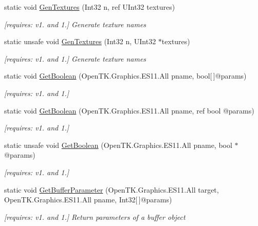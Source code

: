 \begin{DoxyCompactItemize}
static void \hyperlink{class_open_t_k_1_1_graphics_1_1_e_s11_1_1_g_l_af9dbde2086dd504d6b86b9cd4a1ed2ad}{Gen\-Textures} (Int32 n, ref U\-Int32 textures)
\begin{DoxyCompactList}\small\item\em \mbox{[}requires\-: v1. and 1.\mbox{]} Generate texture names \end{DoxyCompactList}\item 
static unsafe void \hyperlink{class_open_t_k_1_1_graphics_1_1_e_s11_1_1_g_l_a75e5e99ca25227c7be8fa03d30234abf}{Gen\-Textures} (Int32 n, U\-Int32 $\ast$textures)
\begin{DoxyCompactList}\small\item\em \mbox{[}requires\-: v1. and 1.\mbox{]} Generate texture names \end{DoxyCompactList}\item 
static void \hyperlink{class_open_t_k_1_1_graphics_1_1_e_s11_1_1_g_l_a2d7e3cb198353007be3f9fcc525f84cc}{Get\-Boolean} (Open\-T\-K.\-Graphics.\-E\-S11.\-All pname, bool\mbox{[}$\,$\mbox{]}@params)
\begin{DoxyCompactList}\small\item\em \mbox{[}requires\-: v1. and 1.\mbox{]}\end{DoxyCompactList}\item 
static void \hyperlink{class_open_t_k_1_1_graphics_1_1_e_s11_1_1_g_l_a08ca14fa818aba7319a8464a5e4f6e6c}{Get\-Boolean} (Open\-T\-K.\-Graphics.\-E\-S11.\-All pname, ref bool @params)
\begin{DoxyCompactList}\small\item\em \mbox{[}requires\-: v1. and 1.\mbox{]}\end{DoxyCompactList}\item 
static unsafe void \hyperlink{class_open_t_k_1_1_graphics_1_1_e_s11_1_1_g_l_a48cb1612828641543c38144a83ffe6ba}{Get\-Boolean} (Open\-T\-K.\-Graphics.\-E\-S11.\-All pname, bool $\ast$@params)
\begin{DoxyCompactList}\small\item\em \mbox{[}requires\-: v1. and 1.\mbox{]}\end{DoxyCompactList}\item 
static void \hyperlink{class_open_t_k_1_1_graphics_1_1_e_s11_1_1_g_l_a141a441fd12f42ba8184b4210295002a}{Get\-Buffer\-Parameter} (Open\-T\-K.\-Graphics.\-E\-S11.\-All target, Open\-T\-K.\-Graphics.\-E\-S11.\-All pname, Int32\mbox{[}$\,$\mbox{]}@params)
\begin{DoxyCompactList}\small\item\em \mbox{[}requires\-: v1. and 1.\mbox{]} Return parameters of a buffer object \end{DoxyCompactList}\item 

\end{DoxyCompactItemize}
